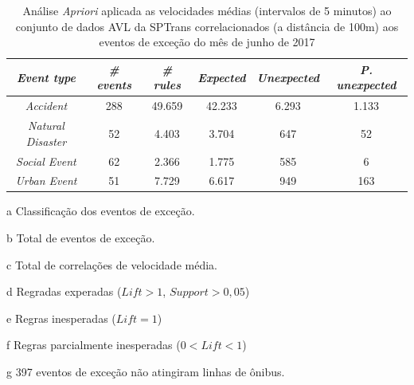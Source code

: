 \documentclass[
	12pt,				%
	oneside,			%
	a4paper,			%
	english,			%
	brazil				%
	]{abntex2ppgsi}
\begin{document}
{{\begin{apendicesenv}
\begin{table}[!htb]
\centering
\begin{threeparttable}
\caption {Análise \textit{Apriori} aplicada as velocidades médias (intervalos de 5 minutos) ao conjunto de dados AVL da SPTrans correlacionados (a distância de 100m) aos eventos de exceção do mês de junho de 2017}
\label {tab:aprioriFull}
\begin{tabular}{c|c|c|c|c|c}
\hline
\textbf{\textit{Event type}}\tnote{a} & \textbf{\textit{\# events}}\tnote{b} & \textit{\textbf{\# rules}}\tnote{c} & \textbf{\textit{Expected}}\tnote{d} & \textbf{\textit{Unexpected}}\tnote{e} & \textbf{\textit{P. unexpected}}\tnote{f}   \\
\hline
\textit{Accident} & 288 & 49.659 & 42.233 & 6.293 & 1.133 \\
\textit{Natural Disaster} & 52 & 4.403 & 3.704 & 647 & 52 \\
\textit{Social Event} & 62 & 2.366 & 1.775 & 585 & 6 \\
\textit{Urban Event} & 51 & 7.729 & 6.617 & 949 & 163 \\
\hline
\end{tabular}
\begin{tablenotes}
            \item[a] Classificação dos eventos de exceção.
            \item[b] Total de eventos de exceção.
            \item[c] Total de correlações de velocidade média.
            \item[d] Regradas experadas ($Lift > 1$, $Support > 0,05$)
            \item[e] Regras inesperadas ($Lift = 1$)
            \item[f] Regras parcialmente inesperadas ($0 < Lift < 1$)
            \item[g] 397 eventos de exceção não atingiram linhas de ônibus.
        \end{tablenotes}
\end{threeparttable}
\end{table}



\end{apendicesenv}}}
\end{document}
